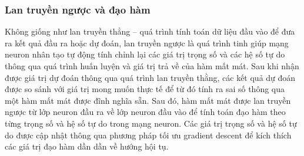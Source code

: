 \documentclass[../DoAn.tex]{subfiles}
\begin{document}
\subsubsection{Lan truyền ngược và đạo hàm}
Không giống như lan truyền thẳng – quá trình tính toán dữ liệu đầu vào để đưa ra
kết quả đầu ra hoặc dự đoán, lan truyền ngược là quá trình tinh giúp mạng neuron nhân
tạo tự động tính chỉnh lại các giá trị trọng số và các hệ số tự do thông qua quá trình huấn luyện và giá trị trả về của hàm mất mát. Sau khi nhận được giá trị dự đoán thông
qua quá trình lan truyền thằng, các kết quả dự đoán được so sánh với giá trị mong
muốn thực tế để từ đó tính ra sai số thông qua một hàm mất mát được đĩnh nghĩa sẵn.
Sau đó, hàm mất mát được lan truyền ngược từ lớp neuron đầu ra về lớp neuron đầu
vào để tính toán đạo hàm theo từng trọng số và hệ số tự do trong mạng neuron. Các giá
trị trọng số và hệ số tự do được cập nhật thông qua phương pháp tối ưu gradient
descent để kích thích các giá trị đạo hàm dần dần về hướng hội tụ.
\end{document}
